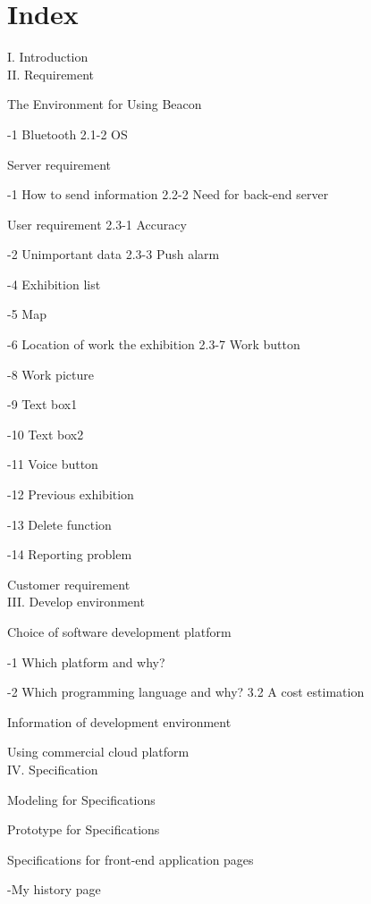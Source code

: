 \documentclass[conference]{IEEEtran}
\begin{document}
\section{Index}

I. Introduction\\


II. Requirement

 The Environment for Using Beacon

-1 Bluetooth 2.1-2 OS

 Server requirement

-1 How to send information 2.2-2 Need for back-end server

 User requirement 2.3-1 Accuracy

-2 Unimportant data 2.3-3 Push alarm

-4 Exhibition list

-5 Map

-6 Location of work the exhibition 2.3-7 Work button

-8 Work picture

-9 Text box1

-10 Text box2

-11 Voice button

-12 Previous exhibition

-13 Delete function

-14 Reporting problem

 Customer requirement\\

III. Develop environment

 Choice of software development platform

-1 Which platform and why?

-2 Which programming language and why? 3.2 A cost estimation

 Information of development environment

 Using commercial cloud platform\\

IV. Specification

 Modeling for Specifications 

 Prototype for Specifications

 Specifications for front-end application pages

\quad\quad-My history page
\end{document}

